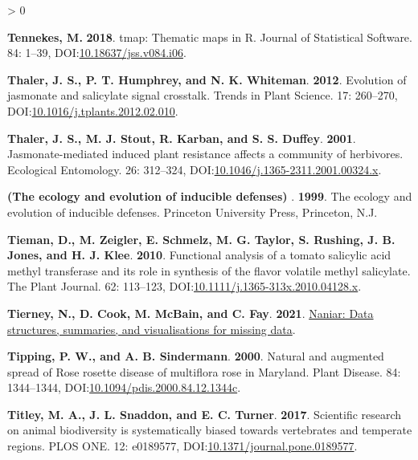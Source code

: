 \documentclass{ufdissertation}[overrideChapters] %
\newlength{\cslhangindent}
\newenvironment{CSLReferences}[2] %
 {%
  \setlength{\parindent}{0pt}
  \ifodd #1 \everypar{\setlength{\hangindent}{\cslhangindent}}\ignorespaces\fi
  \ifnum #2 > 0
  \setlength{\parskip}{#2\baselineskip}
  \fi
 }%
 {}
\begin{document}
{\begin{CSLReferences}{1}{1}
\leavevmode{}%
\textbf{Tennekes, M.} \textbf{2018}. {tmap}: Thematic maps in {R}. Journal of Statistical Software. 84: 1--39, DOI:\href{https://doi.org/10.18637/jss.v084.i06}{10.18637/jss.v084.i06}.

\leavevmode{}%
\textbf{Thaler, J. S., P. T. Humphrey, and N. K. Whiteman}. \textbf{2012}. Evolution of jasmonate and salicylate signal crosstalk. Trends in Plant Science. 17: 260--270, DOI:\href{https://doi.org/10.1016/j.tplants.2012.02.010}{10.1016/j.tplants.2012.02.010}.

\leavevmode{}%
\textbf{Thaler, J. S., M. J. Stout, R. Karban, and S. S. Duffey}. \textbf{2001}. Jasmonate-mediated induced plant resistance affects a community of herbivores. Ecological Entomology. 26: 312--324, DOI:\href{https://doi.org/10.1046/j.1365-2311.2001.00324.x}{10.1046/j.1365-2311.2001.00324.x}.

\leavevmode{}%
\textbf{(The ecology and evolution of inducible defenses) }. \textbf{1999}. The ecology and evolution of inducible defenses. Princeton University Press, Princeton, N.J.

\leavevmode{}%
\textbf{Tieman, D., M. Zeigler, E. Schmelz, M. G. Taylor, S. Rushing, J. B. Jones, and H. J. Klee}. \textbf{2010}. Functional analysis of a tomato salicylic acid methyl transferase and its role in synthesis of the flavor volatile methyl salicylate. The Plant Journal. 62: 113--123, DOI:\href{https://doi.org/10.1111/j.1365-313x.2010.04128.x}{10.1111/j.1365-313x.2010.04128.x}.

\leavevmode{}%
\textbf{Tierney, N., D. Cook, M. McBain, and C. Fay}. \textbf{2021}. \href{https://CRAN.R-project.org/package=naniar}{Naniar: Data structures, summaries, and visualisations for missing data}.

\leavevmode{}%
\textbf{Tipping, P. W., and A. B. Sindermann}. \textbf{2000}. Natural and augmented spread of {Rose rosette disease} of multiflora rose in {Maryland}. Plant Disease. 84: 1344--1344, DOI:\href{https://doi.org/10.1094/pdis.2000.84.12.1344c}{10.1094/pdis.2000.84.12.1344c}.

\leavevmode{}%
\textbf{Titley, M. A., J. L. Snaddon, and E. C. Turner}. \textbf{2017}. Scientific research on animal biodiversity is systematically biased towards vertebrates and temperate regions. {PLOS} {ONE}. 12: e0189577, DOI:\href{https://doi.org/10.1371/journal.pone.0189577}{10.1371/journal.pone.0189577}.


\end{CSLReferences}}
\end{document}
